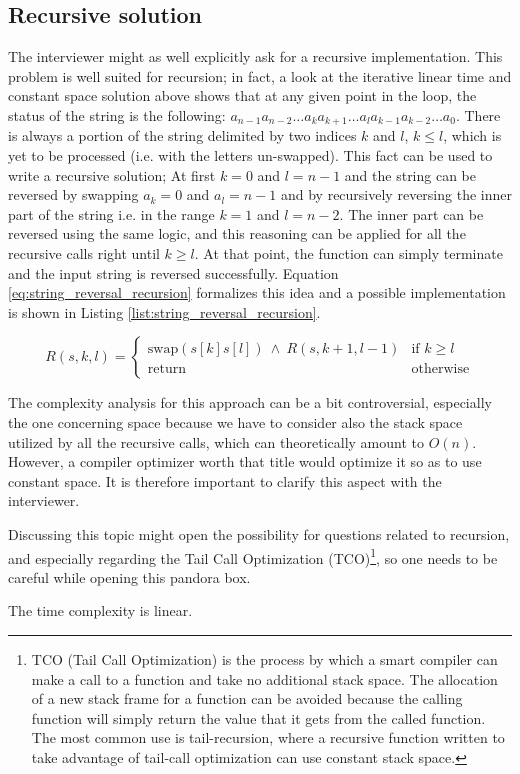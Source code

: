 \subsection{Recursive solution}
The interviewer might as well explicitly ask for a recursive implementation.
This problem is well suited for recursion; in fact, a look at the iterative linear time and constant space solution above shows that at any given point in the loop, the status of the string is the following: 
$a_{n-1}a_{n-2} \ldots a_k a_{k+1} \ldots a_l a_{k-1}a_{k-2} \ldots a_0$. 
There is always a portion of the string delimited by two indices $k$ and $l$, $k \leq l$, which is yet to be processed (i.e. with the letters un-swapped). 
This fact can be used to write a recursive solution;
At first $k=0$ and $l=n-1$ and the string can be reversed by swapping $a_k=0$ and $a_l=n-1$ and
by recursively reversing the inner part of the string i.e. in the range $k=1$ and $l=n-2$.
The inner part can be reversed using the same logic, and this reasoning can be applied for all the recursive calls right until $k \geq l$. At that point, the function can simply terminate and the input string is reversed successfully.
Equation \ref{eq:string_reversal_recursion} formalizes this idea and a possible implementation is shown in Listing \ref{list:string_reversal_recursion}.

\begin{equation}
	R(s, k, l)=
	\begin{cases} 
		\text{swap}(s[k]s[l]) \: \wedge \: R(s,k+1, l-1) & \text{if } k\geq l\\
		\text{return} & \text{otherwise}
	\end{cases}
\label{eq:string_reversal_recursion}
\end{equation} 





The complexity analysis for this approach can be a bit controversial, especially the one concerning space because we have to consider also
the stack space utilized by all the recursive calls, which can theoretically amount to $O(n)$. However, a compiler optimizer worth that title would optimize it so as to use constant space. 
It is therefore important to clarify this aspect with the interviewer.

Discussing this topic might open the possibility for questions related
to recursion, and especially regarding the
Tail Call Optimization (TCO)\footnote{TCO (Tail Call Optimization) is the process by which a smart compiler can make a call to a function and take no additional stack space. The allocation of a new stack frame for a function can be avoided because the calling function will simply return the value that it gets from the called function. The most common use is tail-recursion, where a recursive function written to take advantage of tail-call optimization can	use constant stack space.}, so one needs to be careful while opening this pandora box.

The time complexity is linear. 
